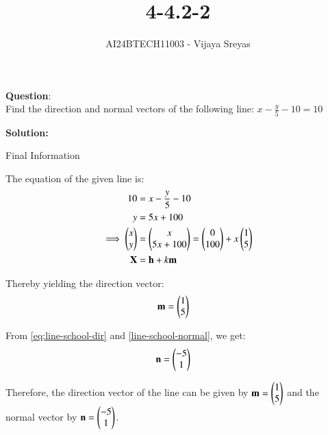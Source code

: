 \documentclass[journal]{IEEEtran}
\begin{document}

\vspace{3cm}

\title{4-4.2-2}
\author{AI24BTECH11003 - Vijaya Sreyas
}
{\let\newpage\relax\maketitle}

\renewcommand{\thefigure}{\theenumi}
\renewcommand{\thetable}{\theenumi}
\setlength{\intextsep}{10pt} %


\renewcommand{\thetable}{\theenumi}


\textbf{Question}:\\
Find the direction and normal vectors of the following line: $x-\frac{y}{5}-10=10$

\textbf{Solution: }

\begin{table}[h!]    
  \centering
  
  \caption{Final Information}
  \label{4-4.2-2-tab-0}
\end{table}

The equation of the given line is:
\begin{align}
    10 &=x-\frac{y}{5}-10 \\
    y &= 5x+100 \\
    \implies \begin{pmatrix}x \\ y\end{pmatrix} &= \begin{pmatrix}x \\ 5x+100\end{pmatrix} = \begin{pmatrix}0 \\ 100\end{pmatrix} + x\begin{pmatrix}1 \\ 5\end{pmatrix} \\
    \mathbf{X} &= \mathbf{h} + k\mathbf{m}
\end{align}

Thereby yielding the direction vector:
\begin{align}
    \mathbf{m} &= \begin{pmatrix}1 \\ 5\end{pmatrix} 
\end{align}

From \eqref{eq:line-school-dir} and \eqref{line-school-normal}, we get:
\begin{align}
    \mathbf{n} &= \begin{pmatrix}-5 \\ 1\end{pmatrix}
\end{align}

Therefore, the direction vector of the line can be given by $\mathbf{m} = \begin{pmatrix}1 \\ 5\end{pmatrix}$ and the normal vector by $\mathbf{n} = \begin{pmatrix}-5 \\ 1\end{pmatrix}$.
\end{document}
